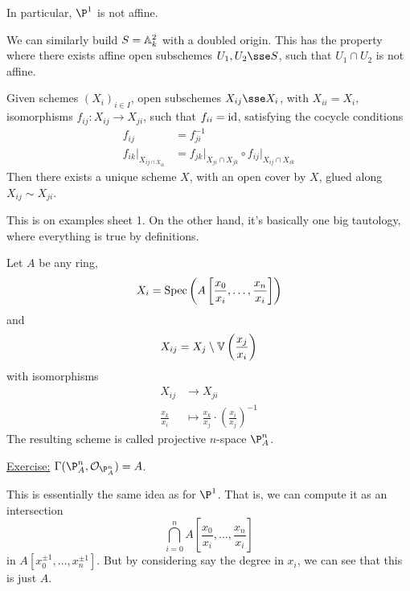 \documentclass{article}
\begin{document}
In particular, \(\P^1\) is not affine.

\begin{example}
    We can similarly build \(S = \mathbb{A}_{k}^{2}\) with a doubled origin. This has the property where there exists affine open subschemes \(U_1, U_2 \sse S\), such that \(U_1 \cap U_2\) is not affine.
\end{example}

\begin{proposition}

    Given schemes \((X_i)_{i \in I}\), open subschemes \(X_{ij} \sse X_i\), with \(X_{ii} = X_i\), isomorphisms \(f_{ij} : X_{ij} \to X_{ji}\), such that \(f_{ii} = \operatorname{id}\), satisfying the cocycle conditions
    \begin{align*}
        f_{ij} &= f_{ji}^{-1} \\
        f_{ik}\vert_{X_{ij\cap X_{ik}}} &= f_{jk}\vert_{X_{ji} \cap X_{jk}} \circ f_{ij}\vert_{X_{ij} \cap X_{ik}}
    \end{align*}
    Then there exists a unique scheme \(X\), with an open cover by \(X\), glued along \(X_{ij} \sim X_{ji}\). 
\end{proposition}

\begin{addendum}
    This is on examples sheet 1. On the other hand, it's basically one big tautology, where everything is true by definitions.
\end{addendum}

\begin{example}
     Let \(A\) be any ring, 
    \[X_i = \operatorname{Spec}\left(A\left[\frac{x_0}{x_i}, \dots, \frac{x_n}{x_i}\right]\right)\]
    and
    \[X_{ij} = X_j \setminus \mathbb{V}\left(\frac{x_j}{x_i}\right)\]
    with isomorphisms
    \begin{align*}
        X_{ij} &\to X_{ji} \\
        \frac{x_k}{x_i} &\mapsto \frac{x_k}{x_j} \cdot \left(\frac{x_i}{x_j}\right)^{-1}
    \end{align*}
    The resulting scheme is called projective \(n\)-space \(\P^n_A\).
\end{example}

\underline{Exercise:} \(\Gamma(\P^n_A, \mcO_{\P^n_A}) = A\). \begin{addendum}
    This is essentially the same idea as for \(\P^1\). That is, we can compute it as an intersection
    \[\bigcap_{i=0}^n A\left[\frac{x_0}{x_i}, \dots, \frac{x_n}{x_i}\right]\]
    in \(A[x_0^{\pm 1}, \dots, x_n^{\pm 1}]\). But by considering say the degree in \(x_i\), we can see that this is just \(A\).
\end{addendum}
\end{document}
